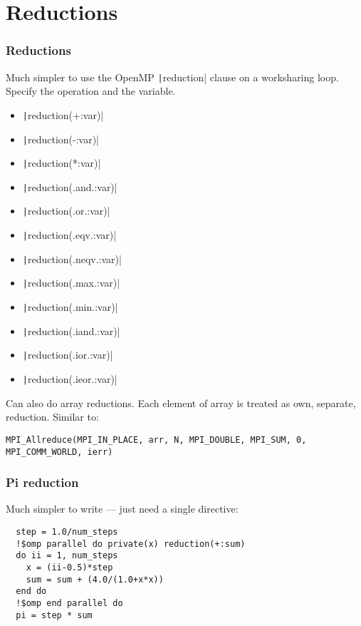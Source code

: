 \documentclass{beamer}
\begin{document}
\section{Reductions}
\begin{frame}[fragile]
\frametitle{Reductions}
Much simpler to use the OpenMP \texttt|reduction| clause on a worksharing loop.
Specify the operation and the variable.
\begin{multicols}{2}
\begin{itemize}
  \item \texttt|reduction(+:var)|
  \item \texttt|reduction(-:var)|
  \item \texttt|reduction(*:var)|
  \item \texttt|reduction(.and.:var)|
  \item \texttt|reduction(.or.:var)|
  \item \texttt|reduction(.eqv.:var)|
  \item \texttt|reduction(.neqv.:var)|
  \item \texttt|reduction(.max.:var)|
  \item \texttt|reduction(.min.:var)|
  \item \texttt|reduction(.iand.:var)|
  \item \texttt|reduction(.ior.:var)|
  \item \texttt|reduction(.ieor.:var)|
\end{itemize}
\end{multicols}

Can also do array reductions. Each element of array is treated as own, separate, reduction.
Similar to:
\begin{verbatim}
MPI_Allreduce(MPI_IN_PLACE, arr, N, MPI_DOUBLE, MPI_SUM, 0, MPI_COMM_WORLD, ierr)
\end{verbatim}

\end{frame}

\begin{frame}[fragile]
\frametitle{Pi reduction}
Much simpler to write --- just need a single directive:
\begin{verbatim}
  step = 1.0/num_steps
  !$omp parallel do private(x) reduction(+:sum)
  do ii = 1, num_steps
    x = (ii-0.5)*step
    sum = sum + (4.0/(1.0+x*x))
  end do
  !$omp end parallel do
  pi = step * sum
\end{verbatim}
\end{frame}
\end{document}
